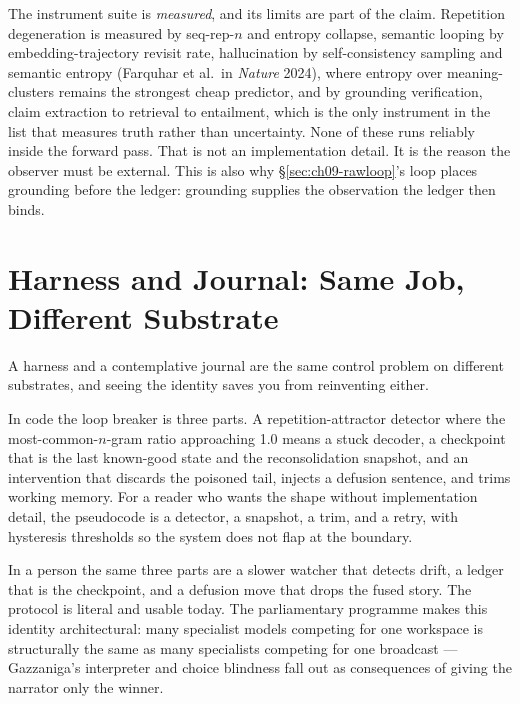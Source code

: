 The instrument suite is \textit{measured}, and its limits are part of the claim. Repetition degeneration is measured by seq-rep-$n$ and entropy collapse, semantic looping by embedding-trajectory revisit rate, hallucination by self-consistency sampling and semantic entropy (Farquhar et al.\ in \textit{Nature} 2024), where entropy over meaning-clusters remains the strongest cheap predictor, and by grounding verification, claim extraction to retrieval to entailment, which is the only instrument in the list that measures truth rather than uncertainty. None of these runs reliably inside the forward pass. That is not an implementation detail. It is the reason the observer must be external. This is also why \S\ref{sec:ch09-rawloop}'s loop places grounding before the ledger: grounding supplies the observation the ledger then binds.

\section{Harness and Journal: Same Job, Different Substrate}
\label{sec:ch09-harness}

A harness and a contemplative journal are the same control problem on different substrates, and seeing the identity saves you from reinventing either.

In code the loop breaker is three parts. A repetition-attractor detector where the most-common-$n$-gram ratio approaching 1.0 means a stuck decoder, a checkpoint that is the last known-good state and the reconsolidation snapshot, and an intervention that discards the poisoned tail, injects a defusion sentence, and trims working memory. For a reader who wants the shape without implementation detail, the pseudocode is a detector, a snapshot, a trim, and a retry, with hysteresis thresholds so the system does not flap at the boundary.

In a person the same three parts are a slower watcher that detects drift, a ledger that is the checkpoint, and a defusion move that drops the fused story. The protocol is literal and usable today. The parliamentary programme makes this identity architectural: many specialist models competing for one workspace is structurally the same as many specialists competing for one broadcast --- Gazzaniga's interpreter and choice blindness fall out as consequences of giving the narrator only the winner.

